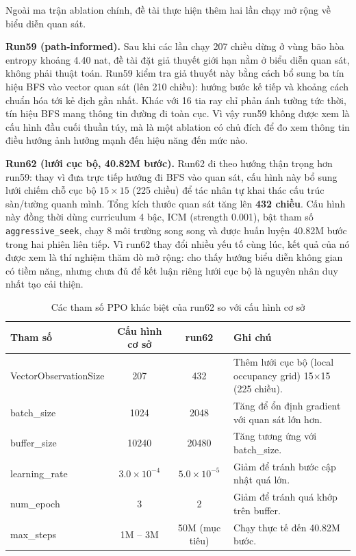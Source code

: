 Ngoài ma trận ablation chính, đề tài thực hiện thêm hai lần chạy mở rộng 
về biểu diễn quan sát.

\textbf{Run59 (path-informed).} Sau khi các lần chạy 207 chiều dừng ở vùng bão hòa entropy khoảng 4.40 nat, đề tài đặt giả thuyết giới hạn nằm ở biểu diễn quan sát, không phải thuật toán. Run59 kiểm tra giả thuyết này bằng cách bổ sung ba tín hiệu BFS vào vector quan sát (lên 210 chiều): hướng bước kế tiếp và khoảng cách chuẩn hóa tới kẻ địch gần nhất. Khác với 16 tia ray chỉ phản ánh tường tức thời, tín hiệu BFS mang thông tin đường đi toàn cục. Vì vậy run59 không được xem là cấu hình đầu cuối thuần túy, mà là một ablation có chủ đích để đo xem thông tin điều hướng ảnh hưởng mạnh đến hiệu năng đến mức nào.

\textbf{Run62 (lưới cục bộ, 40.82M bước).} Run62 đi theo hướng thận trọng hơn run59: thay vì đưa trực tiếp hướng đi BFS vào quan sát, cấu hình này bổ sung lưới chiếm chỗ cục bộ $15\times15$ (225 chiều) để tác nhân tự khai thác cấu trúc sàn/tường quanh mình. Tổng kích thước quan sát tăng lên \textbf{432 chiều}. Cấu hình này đồng thời dùng curriculum 4 bậc, ICM (strength 0.001), bật tham số \texttt{aggressive\_seek}, chạy 8 môi trường song song và được huấn luyện 40.82M bước trong hai phiên liên tiếp. Vì run62 thay đổi nhiều yếu tố cùng lúc, kết quả của nó được xem là thí nghiệm thăm dò mở rộng: cho thấy hướng biểu diễn không gian có tiềm năng, nhưng chưa đủ để kết luận riêng lưới cục bộ là nguyên nhân duy nhất tạo cải thiện.

\begin{table}[H]
    \centering
    \small
    \caption{Các tham số PPO khác biệt của run62 so với cấu hình cơ sở}
    \label{tab:run62_ppo_config}
    \begin{tabular}{|p{4cm}|c|c|p{5cm}|}
        \hline
        \textbf{Tham số} & \textbf{Cấu hình cơ sở} & \textbf{run62} & \textbf{Ghi chú} \\
        \hline
        VectorObservationSize & 207 & 432 & Thêm lưới cục bộ (local occupancy grid) 15$\times$15 (225 chiều). \\
        \hline
        batch\_size & 1024 & 2048 & Tăng để ổn định gradient với quan sát lớn hơn. \\
        \hline
        buffer\_size & 10240 & 20480 & Tăng tương ứng với batch\_size. \\
        \hline
        learning\_rate & $3.0 \times 10^{-4}$ & $5.0 \times 10^{-5}$ & Giảm để tránh bước cập nhật quá lớn. \\
        \hline
        num\_epoch & 3 & 2 & Giảm để tránh quá khớp trên buffer. \\
        \hline
        max\_steps & 1M -- 3M & 50M (mục tiêu) & Chạy thực tế đến 40.82M bước. \\
        \hline
    \end{tabular}
\end{table}
